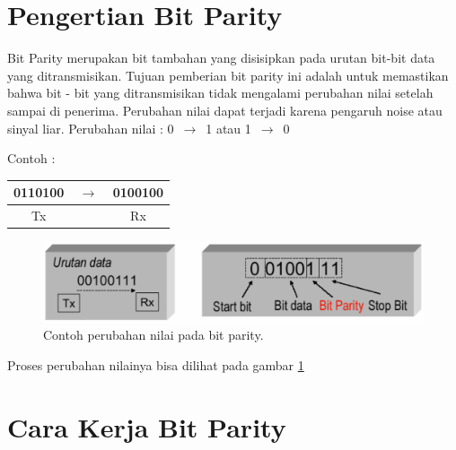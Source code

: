 ﻿%

\section{Pengertian Bit Parity}
Bit Parity merupakan bit tambahan yang disisipkan pada urutan bit-bit data yang ditransmisikan.
Tujuan pemberian bit parity ini adalah untuk memastikan bahwa bit - bit yang ditransmisikan tidak mengalami perubahan nilai setelah sampai di penerima.
Perubahan nilai dapat terjadi karena pengaruh noise atau sinyal liar.
Perubahan nilai : 0 $\,\to\,$ 1 atau 1 $\,\to\,$ 0



\newline Contoh :

\begin{table}[h!]
\centering
\begin{tabular}{ c c c }
0110100 & $\,\to\,$ &  0100100\\
\hline
Tx &  & Rx \\
\end{tabular}
\end{table}

\begin{figure}[ht]
\centerline{\includegraphics[width=1\textwidth]{figures/perubahan_nilai_bit_parity.png}}
\caption{Contoh perubahan nilai pada bit parity.}
\label{perubahan_nilai_bit_parity}
\end{figure}

Proses perubahan nilainya bisa dilihat pada gambar \ref{perubahan_nilai_bit_parity}

\section{Cara Kerja Bit Parity}
